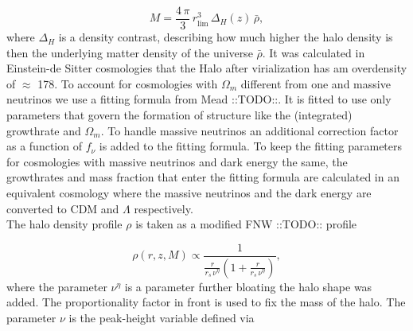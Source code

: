 \documentclass[oneside]{book}
\newcommand*{\marktodo}{{\color{mmcol} ::TODO::}\xspace}
\begin{document}
\begin{equation}
    M = \frac{4\,\pi}{3}\,r_\mathrm{lim}^3\, \Delta_H(z)\,\bar{\rho},
\end{equation}
where $\Delta_H$ is a density contrast, describing how much higher the halo density is then the underlying matter density of the universe $\bar{\rho}$. It was calculated in Einstein-de Sitter cosmologies that the Halo after virialization has am overdensity of $\approx$ 178. To account for cosmologies with $\Omega_m$ different from one and massive neutrinos we use a fitting formula from Mead\marktodo. It is fitted to use only parameters that govern the formation of structure like the (integrated) growthrate and $\Omega_m$. To handle massive neutrinos an additional correction factor as a function of $f_\nu$ is added to the fitting formula. To keep the fitting parameters for cosmologies with massive neutrinos and dark energy the same, the growthrates and mass fraction that enter the fitting formula are calculated in an equivalent cosmology where the massive neutrinos and the dark energy are converted to CDM and $\Lambda$ respectively.\\
The halo density profile $\rho$ is taken as a modified FNW \marktodo profile 

\begin{equation}
    \rho(r,z,M) \propto \frac{1}{\frac{r}{r_s\,\nu^\eta}\left(1+\frac{r}{r_s\,\nu^\eta}\right)},
\end{equation}
where the parameter $\nu^\eta$ is a parameter further bloating the halo shape was added. The proportionality factor in front is used to fix the mass of the halo. The parameter $\nu$ is the peak-height variable defined via 
\end{document}
